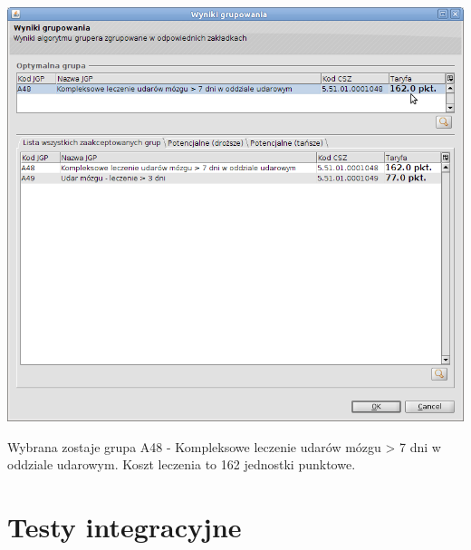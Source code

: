 \includegraphics[scale=0.4]{images/gruper15}

Wybrana zostaje grupa A48 - Kompleksowe leczenie udarów mózgu > 7 dni w oddziale udarowym. Koszt leczenia to 162 jednostki punktowe.


\section{Testy integracyjne}
\label{sec:testyIntegracyjne}

